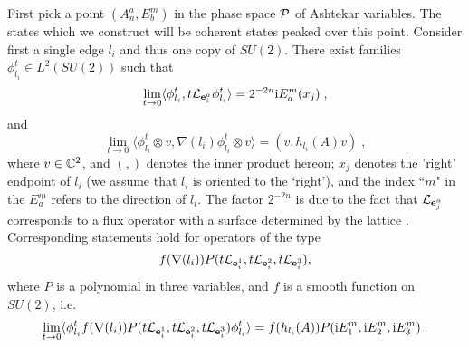 \documentclass[12pt]{article}
\def\G{\Gamma}
\def\cl{{\cal L}}
\def\cp{{\cal P}}
\newcommand{\bbC}{{\Bbb C}}
\begin{document}
First pick a point $(A_n^a,E^m_b)$ in the phase space $\cp$ of Ashtekar variables. The states which we construct will be coherent states peaked over this point.
Consider first a single edge $l_i$ and thus one copy of $SU(2)$. 
There exist families $\phi^t_{l_i}\in L^2(SU(2))$ such that
$$ \lim_{t \to 0}\langle \phi^t_{l_i}, t \cl_{{\bf e}^a_i}\phi_{l_i}^t \rangle=2^{-2n}\mathrm{i}E_a^m(x_{j})\;,$$
and
$$\lim_{t \to 0}\langle \phi_{l_i}^t\otimes v, \nabla(l_i)\phi_{l_i}^t\otimes v \rangle=(v,h_{l_i}(A)v)\;,$$
where $v \in \bbC^2$, and $(,)$ denotes the inner product hereon; $x_{j}$ denotes the 'right' endpoint of $l_i$ (we assume that $l_i$ is oriented to the `right'), and the index ``$m$" in the $E^m_a$ refers to the direction of $l_i$. 
The factor $2^{-2n}$ is due to the fact that $\cl_{{\bf e}_j^a}$ corresponds to a flux operator with a surface determined by the lattice \cite{AGNP1}.
Corresponding statements hold for operators of the type 
$$f(\nabla(l_i))P(t \cl_{{\bf e}^1_i},t \cl_{{\bf e}^2_i},t \cl_{{\bf e}^3_i}),$$  
where $P$ is a polynomial in three variables, and $f$ is a smooth function on $SU(2)$, i.e.
$$ \lim_{t \to 0}\langle \phi^t_{l_i} f(\nabla(l_i))P(t \cl_{{\bf e}^1_i},t \cl_{{\bf e}^2_i},t \cl_{{\bf e}^3_i}) \phi^t_{l_i} \rangle=f(h_{l_i}(A))P(\mathrm{i}E_1^m,\mathrm{i}E_2^m,\mathrm{i}E_3^m)\;.$$
%
%
%
\end{document}
